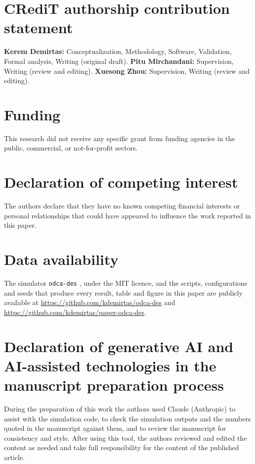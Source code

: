 \documentclass[review,authoryear]{elsarticle}
\begin{document}
\section*{CRediT authorship contribution statement}
\textbf{Kerem Demirtas:} Conceptualization, Methodology, Software, Validation, Formal analysis, Writing (original draft).
\textbf{Pitu Mirchandani:} Supervision, Writing (review and editing).
\textbf{Xuesong Zhou:} Supervision, Writing (review and editing).

\section*{Funding}
This research did not receive any specific grant from funding agencies in the public, commercial, or not-for-profit sectors.

\section*{Declaration of competing interest}
The authors declare that they have no known competing financial interests or personal relationships that could have appeared to influence the work reported in this paper.

\section*{Data availability}
The simulator \texttt{odca-des} \citep{demirtas2026odcades}, under the MIT licence, and the scripts, configurations and seeds that produce every result, table and figure in this paper are publicly available at \url{https://github.com/kdemirtas/odca-des} and \url{https://github.com/kdemirtas/paper-odca-des}.

\section*{Declaration of generative AI and AI-assisted technologies in the manuscript preparation process}
During the preparation of this work the authors used Claude (Anthropic) to assist with the simulation code, to check the simulation outputs and the numbers quoted in the manuscript against them, and to review the manuscript for consistency and style. After using this tool, the authors reviewed and edited the content as needed and take full responsibility for the content of the published article.



\end{document}
